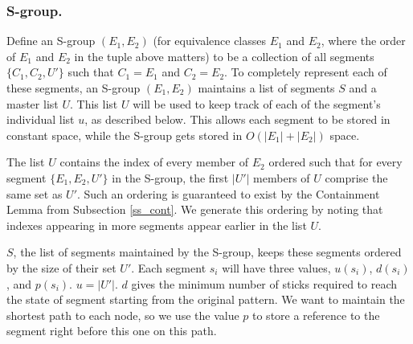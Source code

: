 \subsubsection{S-group.}
 Define an S-group $(E_1, E_2)$
(for equivalence classes $E_1$ and $E_2$, where the order of $E_1$ and $E_2$
in the tuple above matters)
 to be a collection of all segments $\{C_1,C_2,U'\}$
such that $C_1 = E_1$ and $C_2 = E_2$.
 To completely represent each of these segments, an S-group $(E_1, E_2)$
maintains a list of segments $S$ and a master list $U$.
 This list $U$ will be used to keep track of each of the segment's individual
 list $u$, as described below.
 This allows each segment to be stored in constant space, while the S-group gets stored in $O(|E_1|+|E_2|)$ space.

 The list $U$ contains the index of every member of $E_2$ ordered such that for every segment $\{E_1,E_2,U'\}$ in the S-group, the first $|U'|$ members of $U$ comprise the same set as $U'$.
Such an ordering is guaranteed to exist by the Containment Lemma from
 Subsection \ref{ss_cont}.
We generate this ordering by noting that indexes appearing in more segments appear earlier in the list $U$.

$S$, the list of segments maintained by the S-group, keeps these
segments ordered by the size of their set $U'$.
Each segment $s_i$ will have three values, $u(s_i)$, $d(s_i)$, and $p(s_i)$.
$u = |U'|$.
$d$ gives the minimum number of sticks required to reach the state of segment starting from the original pattern.
We want to maintain the shortest path to each node, so we use the value $p$ to store a reference to the segment right before this one on this path. %

